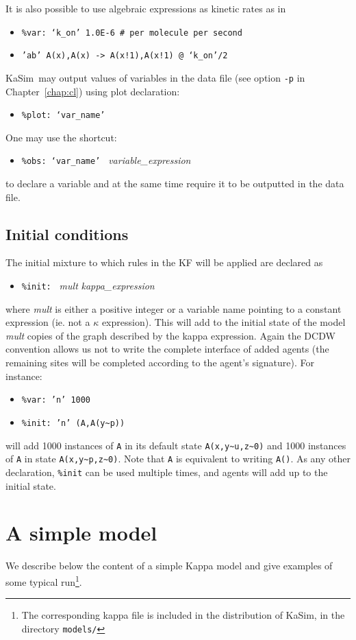 \documentclass[11pt]{book}
\def\KaSim{\textsf{KaSim}}
\def\int{\hbox{\texttt{\~}}}
\def\ttt#1{\texttt{#1}}
\def\noi{\noindent}
\def\ITE#1{\begin{itemize}#1\end{itemize}}
\begin{document}
\vskip 0.25cm
\noi It is also possible to use algebraic expressions as kinetic rates as in
\ITE{
\item[] \ttt{\%var: `k\_on' 1.0E-6 \# per molecule per second}
\item[] \ttt{'ab' A(x),A(x) -> A(x!1),A(x!1) @ `k\_on'/2}
}
\KaSim~may output values of variables in the data file (see option \ttt{-p} in Chapter~\ref{chap:cl}) using plot declaration:
\ITE{
\item[] \ttt{\%plot: `var\_name'}
}
One may use the shortcut: 
\ITE{
\item[] \ttt{\%obs: `var\_name' } \textit{variable\_expression}
}
to declare a variable and at the same time require it to be outputted in the data file. 

\section{Initial conditions}\label{sec:init}

The initial mixture to which rules in the KF will be applied are declared as
\ITE{
\item[] \ttt{\%init: } \textit{mult} \textit{kappa\_expression}
}
where \textit{mult} is either a positive integer or a variable name pointing to a constant expression (ie. not a $\kappa$ expression). This will add to the initial state of the model \textit{mult} copies of the graph described by the kappa expression. Again the DCDW convention allows us not to write the complete interface of added agents (the remaining sites will be completed according to the agent's signature). For instance:
\ITE{
\item[] \ttt{\%var: 'n' 1000}
\item[] \ttt{\%init: 'n' (A,A(y\int p)) }
}
will add 1000 instances of \ttt{A} in its default state \ttt{A(x,y\int u,z\int 0)} and 1000 instances of \ttt{A} in state \ttt{A(x,y\int p,z\int 0)}.
Note that \ttt{A} is equivalent to writing \ttt{A()}. As any other declaration, \ttt{\%init} can be used multiple times, and agents will add up to the initial state.

\chapter{A simple model}\label{chap:abc}

We describe below the content of a simple Kappa model and give examples of some typical run\footnote{The corresponding kappa file is included in the distribution of \KaSim, in the directory \ttt{models/}}.
\end{document}
